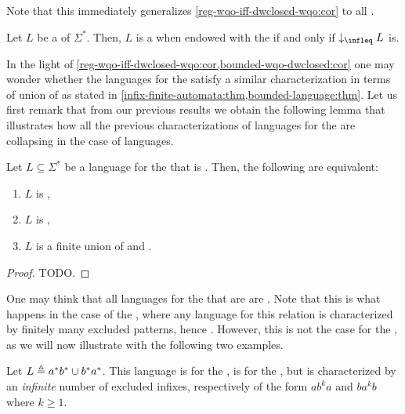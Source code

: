 Note that this immediately generalizes \cref{reg-wqo-iff-dwclosed-wqo:cor}
to all .

\begin{corollary}
    \label{bounded-wqo-dwclosed:cor}
    Let $L$ be a  of $\Sigma^*$. Then,
    $L$ is a  when endowed with the
     if and only if $\dwset[\infleq]{L}$ is.
\end{corollary}


In the light of \cref{reg-wqo-iff-dwclosed-wqo:cor,bounded-wqo-dwclosed:cor}
one may wonder whether the 
languages for the  satisfy a similar characterization in
terms of union of  as stated in
\cref{infix-finite-automata:thm,bounded-language:thm}. Let us
first remark that from our previous results we obtain the following lemma that
illustrates how all the previous characterizations of 
languages for the  are collapsing in the case of
 languages.

\begin{lemma}
    \label{dwclosed-infixes-wqo:lem}
    Let $L \subseteq \Sigma^*$ be a  language for the
     that is . Then, the following
    are equivalent:
    \begin{enumerate}
        \item $L$ is ,
        \item $L$ is ,
        \item $L$ is a finite union of  and .
    \end{enumerate}
\end{lemma}
\begin{proof}
    TODO.
\end{proof}

One may think that all  languages for the  that are  are . Note that this is
what happens in the case of the , where any  language for this relation is characterized by finitely many excluded
patterns, hence . However, this is not the case for the , as we will now illustrate with the following two examples.

\begin{example}
    \label{dwclosed-wqo-not-finite-excl:ex}
    Let $L \triangleq a^* b^* \cup b^* a^*$. This language is  for the , is  for the
    , but is characterized by an \emph{infinite} number 
    of excluded infixes, respectively of the form $ab^ka$ and $ba^kb$ where $k \geq 1$.
\end{example}

